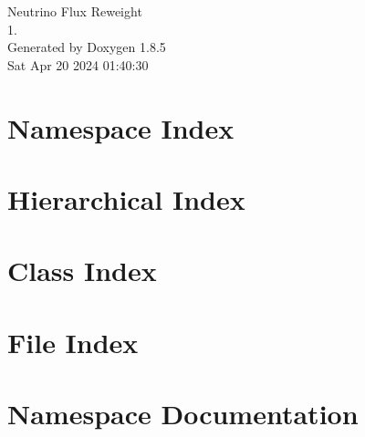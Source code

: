 \documentclass[twoside]{book}
\newcommand{\clearemptydoublepage}{%
  \newpage{\pagestyle{empty}\cleardoublepage}%
}
\begin{document}
\hypersetup{pageanchor=false}
\begin{titlepage}
\vspace*{7cm}
\begin{center}%
{\Large Neutrino Flux Reweight \\[1ex]\large 1. }\\
\vspace*{1cm}
{\large Generated by Doxygen 1.8.5}\\
\vspace*{0.5cm}
{\small Sat Apr 20 2024 01:40:30}\\
\end{center}
\end{titlepage}
\clearemptydoublepage
\tableofcontents
\clearemptydoublepage
{}
\hypersetup{pageanchor=true}

\chapter{Namespace Index}

\chapter{Hierarchical Index}

\chapter{Class Index}

\chapter{File Index}

\chapter{Namespace Documentation}



\end{document}
